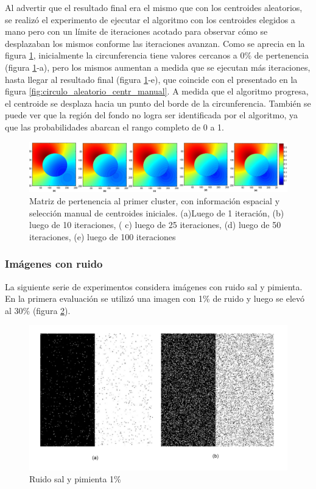 Al advertir que el resultado final era el mismo que con los centroides aleatorios,  se realizó el experimento de ejecutar el algoritmo con los centroides elegidos a mano pero con un límite de iteraciones acotado para observar cómo se desplazaban los mismos conforme las iteraciones avanzan. Como se aprecia en la figura \ref{fig:circulo_iteraciones}, inicialmente la circunferencia tiene valores cercanos a $0\%$ de pertenencia (figura \ref{fig:circulo_iteraciones}-a), pero los mismos aumentan a medida que se ejecutan más iteraciones, hasta llegar al resultado final (figura \ref{fig:circulo_iteraciones}-e), que coincide con el presentado en la figura \ref{fig:circulo_aleatorio_centr_manual}. A medida que el algoritmo progresa, el centroide se desplaza hacia un punto del borde de la circunferencia. También se puede ver que la región del fondo no logra ser identificada por el algoritmo, ya que las probabilidades abarcan el rango completo de 0 a 1. 

\begin{figure}[H]
\centering
\includegraphics[scale=0.08]{images/circulo_iteraciones_x1.jpg}
\caption{Matriz de pertenencia al primer cluster, con información espacial y selección manual de centroides iniciales. (a)Luego de 1 iteración, (b) luego de 10 iteraciones, ( c) luego de 25 iteraciones, (d) luego de 50 iteraciones, (e) luego de 100 iteraciones}
\label{fig:circulo_iteraciones}
\end{figure}

\subsubsection{Imágenes con ruido}
La siguiente serie de experimentos considera imágenes con ruido sal y pimienta. En la primera evaluación se utilizó una imagen con 1\% de ruido y luego se elevó al 30\% (figura \ref{fig:mitad_mitad_ruido_1p}).

\begin{figure}[H]
\centering
\includegraphics[scale=0.06]{images/original_mitad_con_ruido_1y30.jpg}
\caption{Ruido sal y pimienta 1\%}
\label{fig:mitad_mitad_ruido_1p}
\end{figure}

